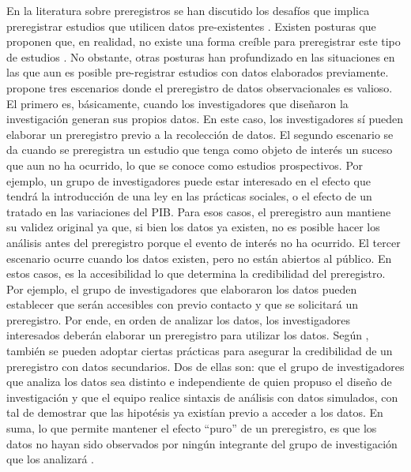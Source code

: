\documentclass[
]{book}
\begin{document}
En la literatura sobre preregistros se han discutido los desafíos que implica preregistrar estudios que utilicen datos pre-existentes \citep[e.g.][]{editors_Observational_2014}. Existen posturas que proponen que, en realidad, no existe una forma creíble para preregistrar este tipo de estudios \citep{christensen_Transparency_2018}. No obstante, otras posturas han profundizado en las situaciones en las que aun es posible pre-registrar estudios con datos elaborados previamente. \citet{burlig_Improving_2018} propone tres escenarios donde el preregistro de datos observacionales es valioso. El primero es, básicamente, cuando los investigadores que diseñaron la investigación generan sus propios datos. En este caso, los investigadores sí pueden elaborar un preregistro previo a la recolección de datos. El segundo escenario se da cuando se preregistra un estudio que tenga como objeto de interés un suceso que aun no ha ocurrido, lo que se conoce como estudios prospectivos. Por ejemplo, un grupo de investigadores puede estar interesado en el efecto que tendrá la introducción de una ley en las prácticas sociales, o el efecto de un tratado en las variaciones del PIB. Para esos casos, el preregistro aun mantiene su validez original ya que, si bien los datos ya existen, no es posible hacer los análisis antes del preregistro porque el evento de interés no ha ocurrido. El tercer escenario ocurre cuando los datos existen, pero no están abiertos al público. En estos casos, es la accesibilidad lo que determina la credibilidad del preregistro. Por ejemplo, el grupo de investigadores que elaboraron los datos pueden establecer que serán accesibles con previo contacto y que se solicitará un preregistro. Por ende, en orden de analizar los datos, los investigadores interesados deberán elaborar un preregistro para utilizar los datos. Según \citet{mertens_Preregistration_2019}, también se pueden adoptar ciertas prácticas para asegurar la credibilidad de un preregistro con datos secundarios. Dos de ellas son: que el grupo de investigadores que analiza los datos sea distinto e independiente de quien propuso el diseño de investigación y que el equipo realice sintaxis de análisis con datos simulados, con tal de demostrar que las hipotésis ya existían previo a acceder a los datos. En suma, lo que permite mantener el efecto ``puro'' de un preregistro, es que los datos no hayan sido observados por ningún integrante del grupo de investigación que los analizará \citep{nosek_preregistration_2018}.
\end{document}
